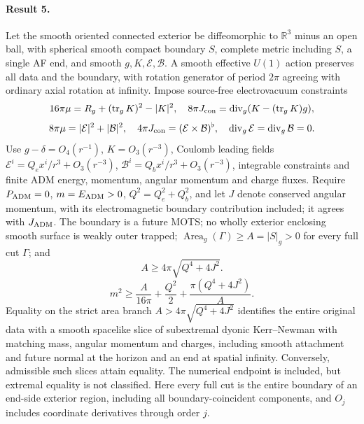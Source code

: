 \documentclass[11pt]{article}
\begin{document}
\paragraph{Result 5.} Let the smooth oriented connected exterior be diffeomorphic to \(\mathbb R^3\) minus an open ball, with spherical smooth compact boundary \(S\), complete metric including \(S\), a single AF end, and smooth \(g,K,\mathcal E,\mathcal B\). A smooth effective \(U(1)\) action preserves all data and the boundary, with rotation generator of period \(2\pi\) agreeing with ordinary axial rotation at infinity. Impose source-free electrovacuum constraints
\[
16\pi\mu=R_g+(\operatorname{tr}_gK)^2-|K|^2,
\quad 8\pi J_{\rm con}=\operatorname{div}_g(K-(\operatorname{tr}_gK)g),
\]
\[
8\pi\mu=|\mathcal E|^2+|\mathcal B|^2,\quad
4\pi J_{\rm con}=(\mathcal E\times\mathcal B)^\flat,\quad
\operatorname{div}_g\mathcal E=\operatorname{div}_g\mathcal B=0.
\]
Use \(g-\delta=O_4(r^{-1})\), \(K=O_3(r^{-3})\), Coulomb leading fields
\(\mathcal E^i=Q_e x^i/r^3+O_3(r^{-3})\), \(\mathcal B^i=Q_b x^i/r^3+O_3(r^{-3})\), integrable constraints and finite ADM energy, momentum, angular momentum and charge fluxes. Require \(P_{\rm ADM}=0\), \(m=E_{\rm ADM}>0\), \(Q^2=Q_e^2+Q_b^2\), and let \(J\) denote conserved angular momentum, with its electromagnetic boundary contribution included; it agrees with \(J_{\rm ADM}\). The boundary is a future MOTS; no wholly exterior enclosing smooth surface is weakly outer trapped; \(\operatorname{Area}_g(\Gamma)\ge A=|S|_g>0\) for every full cut \(\Gamma\); and
\[A\ge4\pi\sqrt{Q^4+4J^2}.\]
\[
m^2\ge\frac{A}{16\pi}+\frac{Q^2}{2}+\frac{\pi(Q^4+4J^2)}{A}.
\]
Equality on the strict area branch \(A>4\pi\sqrt{Q^4+4J^2}\) identifies the entire original data with a smooth spacelike slice of subextremal dyonic Kerr--Newman with matching mass, angular momentum and charges, including smooth attachment and future normal at the horizon and an end at spatial infinity. Conversely, admissible such slices attain equality. The numerical endpoint is included, but extremal equality is not classified. Here every full cut is the entire boundary of an end-side exterior region, including all boundary-coincident components, and $O_j$ includes coordinate derivatives through order $j$.
\end{document}
